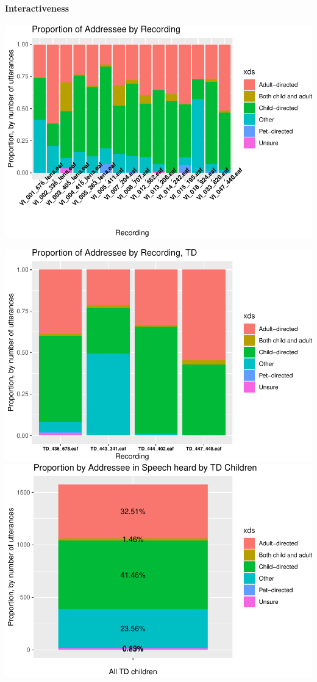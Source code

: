 \documentclass[english,man]{apa6}
\begin{document}
\hypertarget{interactiveness}{%
\paragraph{Interactiveness}\label{interactiveness}}

\includegraphics{input_quality_manuscript_files/figure-latex/ADS-CDS-props-1.pdf}

\includegraphics{input_quality_manuscript_files/figure-latex/unnamed-chunk-3-1.pdf}
\includegraphics{input_quality_manuscript_files/figure-latex/cute-plot-1.pdf}
\end{document}
